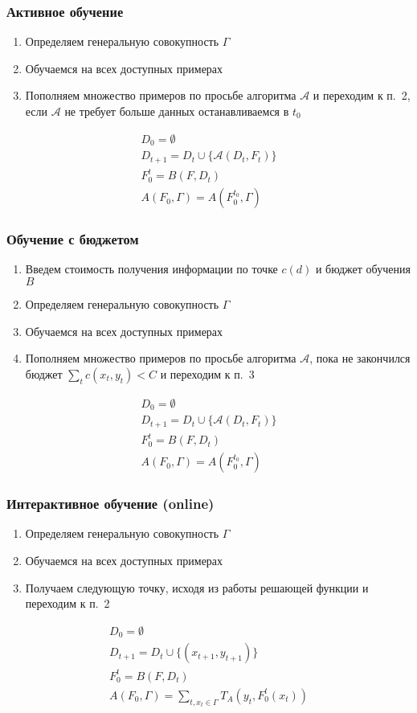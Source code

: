 \documentclass[14pt, fleqn, xcolor={dvipsnames, table}]{beamer}
\begin{document}
\begin{frame}
\frametitle{Активное обучение}
\begin{enumerate}
	\item Определяем генеральную совокупность $\Gamma$
	\item Обучаемся на всех доступных примерах
	\item Пополняем множество примеров по просьбе алгоритма $\mathcal{A}$ и переходим к п.~2, если $\mathcal{A}$ не требует больше данных останавливаемся в $t_0$
\end{enumerate}
$$\begin{array}{l}
D_0 = \emptyset \\
D_{t+1} = D_{t} \cup \{\mathcal{A}(D_t, F_t)\} \\
F_0^t = B(F, D_{t}) \\
A(F_0, \Gamma) = A(F_0^{t_0}, \Gamma)
\end{array}$$
\end{frame}

\begin{frame}
\frametitle{Обучение с бюджетом}
\begin{enumerate}
	\item Введем стоимость получения информации по точке $c(d)$ и бюджет обучения $B$
	\item Определяем генеральную совокупность $\Gamma$
	\item Обучаемся на всех доступных примерах
	\item Пополняем множество примеров по просьбе алгоритма $\mathcal{A}$, пока не закончился бюджет $\sum_t c({x_t, y_t}) < C$ и переходим к п.~3
\end{enumerate}
$$\begin{array}{l}
D_0 = \emptyset \\
D_{t+1} = D_{t} \cup \{\mathcal{A}(D_t, F_t)\} \\
F_0^t = B(F, D_{t}) \\
A(F_0, \Gamma) = A(F_0^{t_0}, \Gamma)
\end{array}$$
\end{frame}

\begin{frame}
\frametitle{Интерактивное обучение (online)}
\begin{enumerate}
	\item Определяем генеральную совокупность $\Gamma$
	\item Обучаемся на всех доступных примерах
	\item Получаем следующую точку, исходя из работы решающей функции и переходим к п.~2
\end{enumerate}
$$\begin{array}{l}
D_0 = \emptyset \\
D_{t+1} = D_{t} \cup \{(x_{t+1}, y_{t+1})\} \\
F_0^t = B(F, D_{t}) \\
A(F_0, \Gamma) = \sum_{t, x_t \in \Gamma} T_A(y_t, F_0^t(x_t)) \\
\end{array}$$
\end{frame}
\end{document}
